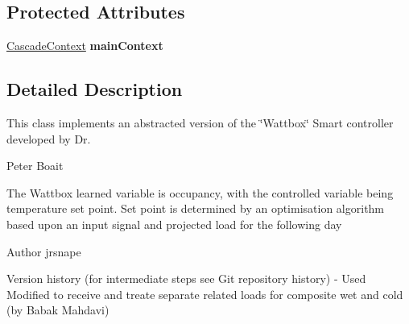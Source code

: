 \subsection*{Protected Attributes}
\begin{DoxyCompactItemize}
\item 
\hypertarget{classuk_1_1ac_1_1dmu_1_1iesd_1_1cascade_1_1controllers_1_1_proportional_wattbox_controller_a585a3e6de19032cfbbc41d483556fce2}{\hyperlink{classuk_1_1ac_1_1dmu_1_1iesd_1_1cascade_1_1context_1_1_cascade_context}{Cascade\-Context} {\bfseries main\-Context}}\label{classuk_1_1ac_1_1dmu_1_1iesd_1_1cascade_1_1controllers_1_1_proportional_wattbox_controller_a585a3e6de19032cfbbc41d483556fce2}

\end{DoxyCompactItemize}


\subsection{Detailed Description}
This class implements an abstracted version of the \char`\"{}\-Wattbox\char`\"{} Smart controller developed by Dr. 

Peter Boait

The Wattbox learned variable is occupancy, with the controlled variable being temperature set point. Set point is determined by an optimisation algorithm based upon an input signal and projected load for the following day

\begin{DoxyAuthor}{Author}
jrsnape \begin{DoxyVerb}    Version history (for intermediate steps see Git repository history) -
    Used Modified to receive and treate separate related loads for
    composite wet and cold (by Babak Mahdavi)\end{DoxyVerb}
 
\end{DoxyAuthor}


